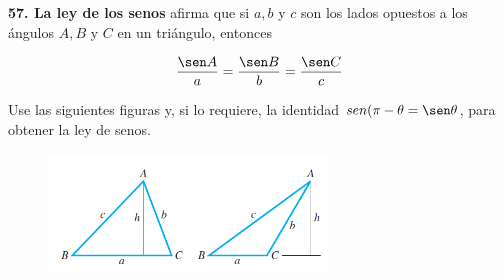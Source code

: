 \documentclass[12pt, letterpaper]{article}
\begin{document}
\textbf{57. La ley de los senos} afirma que si $a, b$ y $c$ son los lados opuestos a los ángulos $A, B$ y $C$ en un triángulo, entonces

\begin{align*}
 	\frac{\sen A}{a} =  \frac{\sen B}{b} = \frac{\sen C}{c}
\end{align*}

Use las siguientes figuras y, si lo requiere, la identidad $sen(\pi - \theta = \sen \theta$, para obtener la ley de senos.

\begin{figure}[ht]
\centering
\includegraphics[width=20em]{t7uno}
\end{figure}
\end{document}
